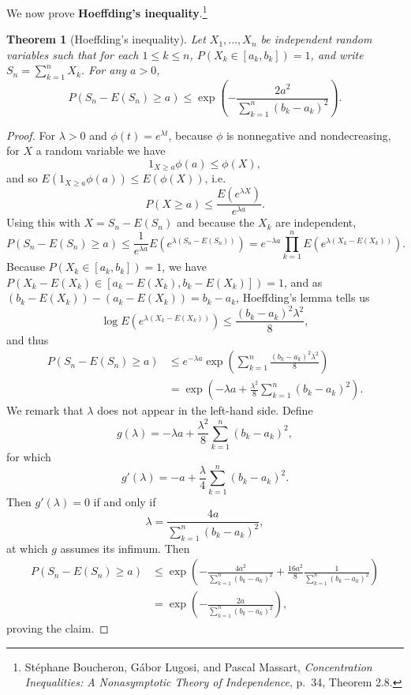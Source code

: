 \documentclass{article}
\newtheorem{theorem}{Theorem}
\theoremstyle{definition}
\begin{document}
We now  prove \textbf{Hoeffding's inequality}.\footnote{St\'ephane Boucheron, G\'abor Lugosi, and
Pascal Massart, {\em Concentration Inequalities: A Nonasymptotic Theory of Independence}, p.~34, Theorem 2.8.}

\begin{theorem}[Hoeffding's inequality]
Let $X_1,\ldots,X_n$ be independent random variables such that for each $1 \leq k \leq n$, 
$P(X_k \in [a_k,b_k])=1$, and write
$S_n=\sum_{k=1}^n X_k$.
For any $a>0$,
\[
P(S_n-E(S_n) \geq a) \leq \exp\left(-\frac{2a^2}{\sum_{k=1}^n (b_k-a_k)^2} \right).
\]
\end{theorem}
\begin{proof}
For $\lambda>0$ 
and  $\phi(t)=e^{\lambda t}$, 
because $\phi$ is nonnegative and nondecreasing, for $X$ a random variable we have
\[
1_{X \geq a} \phi(a) \leq \phi(X),
\]
and so
$E(1_{X \geq a} \phi(a)) \leq E(\phi(X))$, i.e.
\[
P(X \geq a) \leq \frac{E(e^{\lambda X})}{e^{\lambda a}}.
\]
Using this with $X=S_n-E(S_n)$ and because the $X_k$ are independent,
\[
P(S_n-E(S_n) \geq a) \leq \frac{1}{e^{\lambda a}} E(e^{\lambda(S_n-E(S_n))})
=e^{-\lambda a} \prod_{k=1}^n E(e^{\lambda(X_k-E(X_k))}).
\]
Because $P(X_k \in [a_k,b_k])=1$, we have $P(X_k-E(X_k) \in [a_k-E(X_k),b_k-E(X_k)])=1$, and  as
$(b_k-E(X_k))-(a_k-E(X_k))=b_k-a_k$,  Hoeffding's lemma tells us
\[
\log E(e^{\lambda(X_k-E(X_k))}) \leq \frac{(b_k-a_k)^2 \lambda^2}{8},
\]
and thus
\begin{align*}
P(S_n-E(S_n) \geq a)& \leq e^{-\lambda a} \exp\left( \sum_{k=1}^n \frac{(b_k-a_k)^2 \lambda^2}{8} \right)\\
&=\exp\left(-\lambda a + \frac{\lambda^2}{8} \sum_{k=1}^n (b_k-a_k)^2\right).
\end{align*}
We remark that
 $\lambda$ does not appear in the left-hand side. Define
 \[
 g(\lambda) = -\lambda a + \frac{\lambda^2}{8} \sum_{k=1}^n (b_k-a_k)^2,
 \]
 for which 
 \[
 g'(\lambda)=-a + \frac{\lambda}{4} \sum_{k=1}^n(b_k-a_k)^2.
 \]
 Then $g'(\lambda)=0$ if and only if
 \[
\lambda = \frac{4a}{ \sum_{k=1}^n(b_k-a_k)^2},
 \]
 at which $g$ assumes its infimum. Then
 \begin{align*}
 P(S_n-E(S_n) \geq a) &\leq \exp\left( -\frac{4a^2}{\sum_{k=1}^n(b_k-a_k)^2} + \frac{16a^2}{8} \frac{1}{\sum_{k=1}^n(b_k-a_k)^2} \right)\\
 &=\exp\left(-\frac{2a}{\sum_{k=1}^n(b_k-a_k)^2}\right),
 \end{align*}
proving the claim.
\end{proof}
\end{document}
